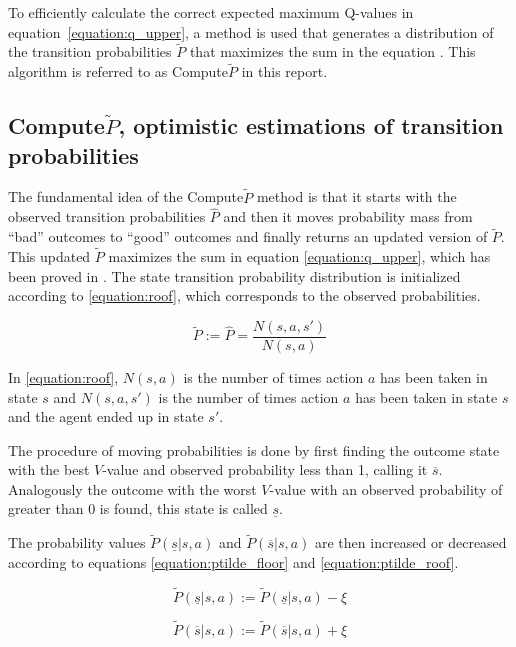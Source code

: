 To efficiently calculate the correct expected maximum Q-values in
equation~\eqref{equation:q_upper}, a method is used that generates a
distribution of the transition probabilities $\tilde{P}$ that maximizes the sum
in the equation \parencite{Strehl20081309}. This algorithm is referred to as
Compute$\tilde{P}$ in this report.

\subsection{Compute$\tilde{P}$, optimistic estimations of transition probabilities}

The fundamental idea of the Compute$\tilde{P}$ method is that it starts with
the observed transition probabilities $\hat{P}$ and then it moves probability
mass from ``bad'' outcomes to ``good'' outcomes and finally returns an updated
version of $\tilde{P}$. This updated $\tilde{P}$ maximizes the sum in equation
\eqref{equation:q_upper}, which has been proved in \textcite{Strehl20081309}.
The state transition probability distribution is initialized according to
\eqref{equation:roof}, which corresponds to the observed probabilities.

\begin{equation}
\label{equation:roof}
\tilde{P} := \hat{P} = \frac{N(s,a,s')}{N(s,a)}
\end{equation}

In \eqref{equation:roof}, $N(s, a)$ is the number of times action $a$ has been taken in
state $s$ and $N(s, a, s')$ is the number of times action $a$ has been taken in
state $s$ and the agent ended up in state $s'$.

The procedure of moving probabilities is done by first finding the outcome
state with the best $V$-value and observed probability less than 1, calling it
$\overline{s}$. Analogously the outcome with the worst $V$-value with an
observed probability of greater than 0 is found, this state is called
$\underline{s}$. 

The probability values $\tilde{P}(\underline{s}|s,a)$ and
$\tilde{P}(\overline{s}|s,a)$ are then increased or decreased according to
equations \eqref{equation:ptilde_floor} and \eqref{equation:ptilde_roof}.

\begin{equation}
\label{equation:ptilde_floor}
\tilde{P}(\underline{s}|s,a) := \tilde{P}(\underline{s}|s,a)-\xi
\end{equation}

\begin{equation}
\label{equation:ptilde_roof}
\tilde{P}(\overline{s}|s,a) := \tilde{P}(\overline{s}|s,a)+\xi
\end{equation}


